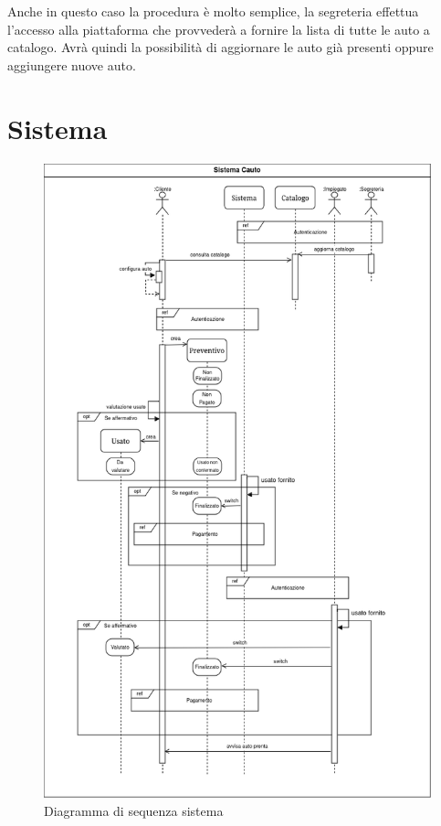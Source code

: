 \documentclass[a4paper, 11pt,oneside]{book}
\newcommand{\spacing}{\par\bigskip\noindent}
\begin{document}
        \spacing
        Anche in questo caso la procedura è molto semplice, la segreteria effettua l'accesso alla piattaforma che provvederà a fornire la lista di tutte le auto a catalogo. Avrà quindi la possibilità di aggiornare le auto
        già presenti oppure aggiungere nuove auto.
    \section{Sistema}
        \begin{figure}[H]
            \centering
            \includegraphics[scale=0.5]{sequence_diagram_sistema.png}
            \caption{Diagramma di sequenza sistema}
            \label{fig:diagramma_sequenza_sistema}
        \end{figure}
\end{document}
